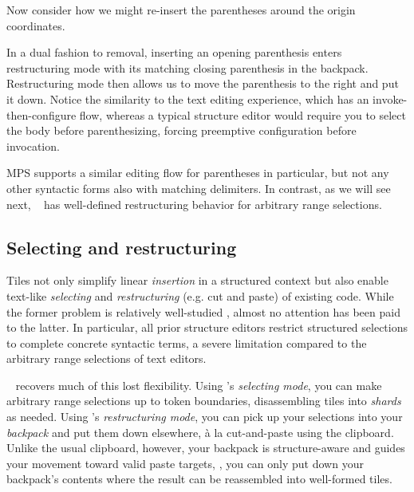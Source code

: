 Now consider how we might re-insert the parentheses
around the origin coordinates.


\noindent
In a dual fashion to removal, inserting
an opening parenthesis enters restructuring mode with its
matching closing parenthesis in the backpack.
Restructuring mode then allows us to move the parenthesis
to the right and put it down.
Notice the similarity to the text editing experience,
which has an invoke-then-configure flow, whereas a typical
structure editor would require you to select the body before
parenthesizing, forcing preemptive configuration before
invocation.

MPS supports a similar editing flow for parentheses in particular,
but not any other syntactic forms also with matching delimiters.
In contrast, as we will see next, \tylr~ has well-defined
restructuring behavior for arbitrary range selections.

\subsection{Selecting and restructuring}
Tiles not only simplify linear \emph{insertion} in a structured
context but also enable text-like \emph{selecting}
and \emph{restructuring} (e.g. cut and paste) of existing code.
While the former problem is relatively well-studied
,
almost no attention has been paid to the latter.
In particular, all prior structure editors restrict
structured selections to complete concrete syntactic terms,
a severe limitation compared to the arbitrary range
selections of text editors.

\tylr~ recovers much of this lost flexibility.
Using \tylr's \emph{selecting mode}, you can
make arbitrary range selections up to token boundaries,
disassembling tiles into \emph{shards} as needed.
Using \tylr's \emph{restructuring mode},
you can pick up your selections into your
\emph{backpack} and put them down elsewhere,
à la cut-and-paste using the clipboard.
Unlike the usual clipboard, however,
your backpack is structure-aware and guides your
movement toward valid paste targets, \ie,
you can only put down your backpack's contents
where the result can be reassembled into well-formed tiles.



